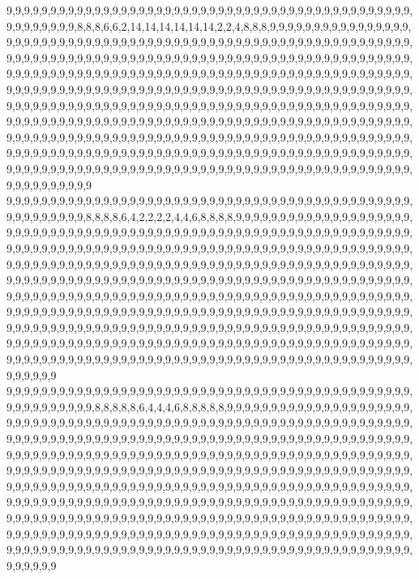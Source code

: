 9,9,9,9,9,9,9,9,9,9,9,9,9,9,9,9,9,9,9,9,9,9,9,9,9,9,9,9,9,9,9,9,9,9,9,9,9,9,9,9,9,9,9,9,9,9,9,9,9,9,9,9,9,9,8,8,8,6,6,2,14,14,14,14,14,14,2,2,4,8,8,8,9,9,9,9,9,9,9,9,9,9,9,9,9,9,9,9,9,9,9,9,9,9,9,9,9,9,9,9,9,9,9,9,9,9,9,9,9,9,9,9,9,9,9,9,9,9,9,9,9,9,9,9,9,9,9,9,9,9,9,9,9,9,9,9,9,9,9,9,9,9,9,9,9,9,9,9,9,9,9,9,9,9,9,9,9,9,9,9,9,9,9,9,9,9,9,9,9,9,9,9,9,9,9,9,9,9,9,9,9,9,9,9,9,9,9,9,9,9,9,9,9,9,9,9,9,9,9,9,9,9,9,9,9,9,9,9,9,9,9,9,9,9,9,9,9,9,9,9,9,9,9,9,9,9,9,9,9,9,9,9,9,9,9,9,9,9,9,9,9,9,9,9,9,9,9,9,9,9,9,9,9,9,9,9,9,9,9,9,9,9,9,9,9,9,9,9,9,9,9,9,9,9,9,9,9,9,9,9,9,9,9,9,9,9,9,9,9,9,9,9,9,9,9,9,9,9,9,9,9,9,9,9,9,9,9,9,9,9,9,9,9,9,9,9,9,9,9,9,9,9,9,9,9,9,9,9,9,9,9,9,9,9,9,9,9,9,9,9,9,9,9,9,9,9,9,9,9,9,9,9,9,9,9,9,9,9,9,9,9,9,9,9,9,9,9,9,9,9,9,9,9,9,9,9,9,9,9,9,9,9,9,9,9,9,9,9,9,9,9,9,9,9,9,9,9,9,9,9,9,9,9,9,9,9,9,9,9,9,9,9,9,9,9,9,9,9,9,9,9,9,9,9,9,9,9,9,9,9,9,9,9,9,9,9,9,9,9,9,9,9,9,9,9,9,9,9,9,9,9,9,9,9,9,9,9,9,9,9,9,9,9,9,9,9,9,9,9,9,9,9,9,9,9,9,9,9,9,9,9,9,9,9,9,9,9,9,9,9,9,9,9,9,9,9,9,9,9,9,9,9,9,9,9,9,9,9,9,9,9,9
9,9,9,9,9,9,9,9,9,9,9,9,9,9,9,9,9,9,9,9,9,9,9,9,9,9,9,9,9,9,9,9,9,9,9,9,9,9,9,9,9,9,9,9,9,9,9,9,9,9,9,9,9,9,9,8,8,8,8,6,4,2,2,2,2,4,4,6,8,8,8,8,9,9,9,9,9,9,9,9,9,9,9,9,9,9,9,9,9,9,9,9,9,9,9,9,9,9,9,9,9,9,9,9,9,9,9,9,9,9,9,9,9,9,9,9,9,9,9,9,9,9,9,9,9,9,9,9,9,9,9,9,9,9,9,9,9,9,9,9,9,9,9,9,9,9,9,9,9,9,9,9,9,9,9,9,9,9,9,9,9,9,9,9,9,9,9,9,9,9,9,9,9,9,9,9,9,9,9,9,9,9,9,9,9,9,9,9,9,9,9,9,9,9,9,9,9,9,9,9,9,9,9,9,9,9,9,9,9,9,9,9,9,9,9,9,9,9,9,9,9,9,9,9,9,9,9,9,9,9,9,9,9,9,9,9,9,9,9,9,9,9,9,9,9,9,9,9,9,9,9,9,9,9,9,9,9,9,9,9,9,9,9,9,9,9,9,9,9,9,9,9,9,9,9,9,9,9,9,9,9,9,9,9,9,9,9,9,9,9,9,9,9,9,9,9,9,9,9,9,9,9,9,9,9,9,9,9,9,9,9,9,9,9,9,9,9,9,9,9,9,9,9,9,9,9,9,9,9,9,9,9,9,9,9,9,9,9,9,9,9,9,9,9,9,9,9,9,9,9,9,9,9,9,9,9,9,9,9,9,9,9,9,9,9,9,9,9,9,9,9,9,9,9,9,9,9,9,9,9,9,9,9,9,9,9,9,9,9,9,9,9,9,9,9,9,9,9,9,9,9,9,9,9,9,9,9,9,9,9,9,9,9,9,9,9,9,9,9,9,9,9,9,9,9,9,9,9,9,9,9,9,9,9,9,9,9,9,9,9,9,9,9,9,9,9,9,9,9,9,9,9,9,9,9,9,9,9,9,9,9,9,9,9,9,9,9,9,9,9,9,9,9,9,9,9,9,9,9,9,9,9,9,9,9,9,9,9,9,9,9,9,9,9,9,9,9,9,9,9,9,9,9,9,9,9,9,9,9,9,9,9
9,9,9,9,9,9,9,9,9,9,9,9,9,9,9,9,9,9,9,9,9,9,9,9,9,9,9,9,9,9,9,9,9,9,9,9,9,9,9,9,9,9,9,9,9,9,9,9,9,9,9,9,9,9,9,9,8,8,8,8,8,6,4,4,4,6,8,8,8,8,8,9,9,9,9,9,9,9,9,9,9,9,9,9,9,9,9,9,9,9,9,9,9,9,9,9,9,9,9,9,9,9,9,9,9,9,9,9,9,9,9,9,9,9,9,9,9,9,9,9,9,9,9,9,9,9,9,9,9,9,9,9,9,9,9,9,9,9,9,9,9,9,9,9,9,9,9,9,9,9,9,9,9,9,9,9,9,9,9,9,9,9,9,9,9,9,9,9,9,9,9,9,9,9,9,9,9,9,9,9,9,9,9,9,9,9,9,9,9,9,9,9,9,9,9,9,9,9,9,9,9,9,9,9,9,9,9,9,9,9,9,9,9,9,9,9,9,9,9,9,9,9,9,9,9,9,9,9,9,9,9,9,9,9,9,9,9,9,9,9,9,9,9,9,9,9,9,9,9,9,9,9,9,9,9,9,9,9,9,9,9,9,9,9,9,9,9,9,9,9,9,9,9,9,9,9,9,9,9,9,9,9,9,9,9,9,9,9,9,9,9,9,9,9,9,9,9,9,9,9,9,9,9,9,9,9,9,9,9,9,9,9,9,9,9,9,9,9,9,9,9,9,9,9,9,9,9,9,9,9,9,9,9,9,9,9,9,9,9,9,9,9,9,9,9,9,9,9,9,9,9,9,9,9,9,9,9,9,9,9,9,9,9,9,9,9,9,9,9,9,9,9,9,9,9,9,9,9,9,9,9,9,9,9,9,9,9,9,9,9,9,9,9,9,9,9,9,9,9,9,9,9,9,9,9,9,9,9,9,9,9,9,9,9,9,9,9,9,9,9,9,9,9,9,9,9,9,9,9,9,9,9,9,9,9,9,9,9,9,9,9,9,9,9,9,9,9,9,9,9,9,9,9,9,9,9,9,9,9,9,9,9,9,9,9,9,9,9,9,9,9,9,9,9,9,9,9,9,9,9,9,9,9,9,9,9,9,9,9,9,9,9,9,9,9,9,9,9,9,9,9,9,9,9,9,9,9,9,9,9,9,9
